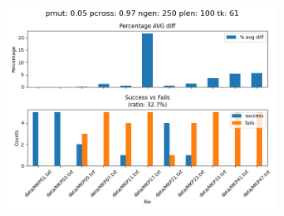 \begin{figure}[H]
\begin{subfigure}{.3\textwidth}
        \includegraphics[width=\textwidth]{img/tuning/tuning_results_5_97_250_100_61.png}
    \end{subfigure}\\


\end{figure}
